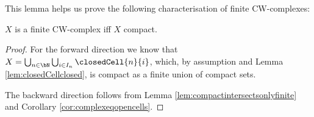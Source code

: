 This lemma helps us prove the following characterisation of finite CW-complexes: 

\begin{lem} \label{lem:finiteiffcompact}
    $X$ is a finite CW-complex iff $X$ compact. 
    \href{https://github.com/scholzhannah/CWComplexes/blob/7be4872a05b534011cc969eb5b80a4b7f0bf57e2/CWcomplexes/Lemmas.lean#L298-L299}{\faExternalLink}
\end{lem}
\begin{proof}
    For the forward direction we know that $X = \bigcup_{n \in \bN}\bigcup_{i \in I_n} \closedCell{n}{i}$, which, by assumption and Lemma \ref{lem:closedCellclosed}, is compact as a finite union of compact sets. 

    The backward direction follows from Lemma \ref{lem:compactintersectsonlyfinite} and Corollary \ref{cor:complexeqopencells}.
\end{proof}